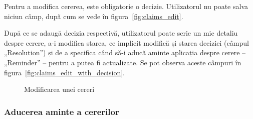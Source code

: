 	Pentru a modifica cererea, este obligatorie o decizie.
	Utilizatorul nu poate salva niciun câmp, după cum se vede în figura~\ref{fig:claims_edit}.

	După ce se adaugă decizia respectivă, utilizatorul poate scrie un mic detaliu despre cerere, a-i modifica starea, ce implicit modifică și starea deciziei (câmpul „Resolution”) și de a specifica când să-i aducă aminte aplicația despre cerere -- „Reminder” -- pentru a putea fi actualizate.
	Se pot observa aceste câmpuri în figura~\ref{fig:claims_edit_with_decision}.
	\begin{figure}
		\centering
		\caption{Modificarea unei cereri}
	\end{figure}

	\subsubsection{Aducerea aminte a cererilor}

